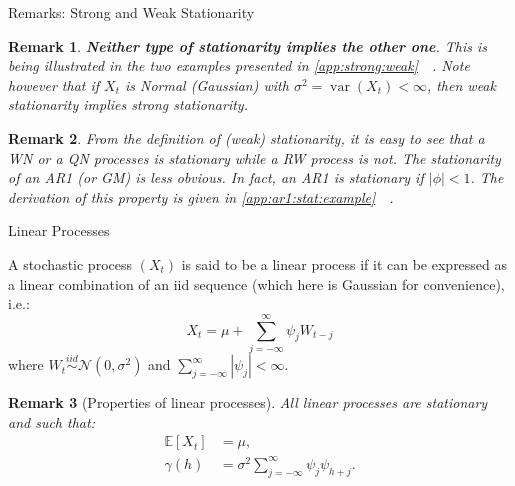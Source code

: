 \documentclass[envcountsect,usenames,dvipsnames]{beamer}
\DeclareMathOperator*{\var}{var}
\def\simiid{\stackrel{iid}{\sim}}
\theoremstyle{mystyle}
\newtheorem{Remark}{Remark}
\begin{document}
\begin{frame}{Remarks: Strong and Weak Stationarity}

	\begin{Remark}
	\label{rem:stati}
	\textbf{Neither type of stationarity implies the other one}. This is being illustrated in the two examples presented in \ref{app:strong:weak} $\;$ \hyperlink{app:strong:weak}{}. Note however that if $X_{t}$ is Normal (Gaussian) with $\sigma^2=\var(X_{t})<\infty$, then weak stationarity implies strong stationarity.
	\end{Remark}
	
	\begin{Remark}
	\label{rem:verif}
	From the definition of (weak) stationarity, it is easy to see that a WN or a QN processes is stationary while a RW process is not. The stationarity of an AR1 (or GM) is less obvious. In fact, an AR1 is stationary if $|\phi| < 1$. The derivation of this property is given in \ref{app:ar1:stat:example} $\;$ \hyperlink{app:strong:weak}{}.
	\end{Remark}
\end{frame}

  
\begin{frame}{Linear Processes}
\footnotesize

\begin{Definition}
\label{def:linear:process}
A stochastic process $(X_t)$ is said to be a linear process if it can be expressed as a linear combination of an iid sequence (which here is Gaussian for convenience), i.e.:
%
\[{X_t} = \mu + \sum\limits_{j =  - \infty }^\infty  {{\psi _j}{W_{t - j}}} \]
%
where $W_t \simiid \mathcal{N}(0, \sigma^2)$ and $\sum\limits_{j =  - \infty }^\infty  {\left| {{\psi _j}} \right|}  < \infty$.

\end{Definition}

\begin{Remark}[Properties of linear processes]
All linear processes are stationary and such that:
%
\[\begin{aligned}
\mathbb{E}[X_t] &= \mu, \\
\gamma(h) &= \sigma^2\sum\limits_{j =  - \infty }^\infty  {{\psi _j}{\psi _{h + j}}}.
\end{aligned}\]
\end{Remark}
\end{frame}
\end{document}
